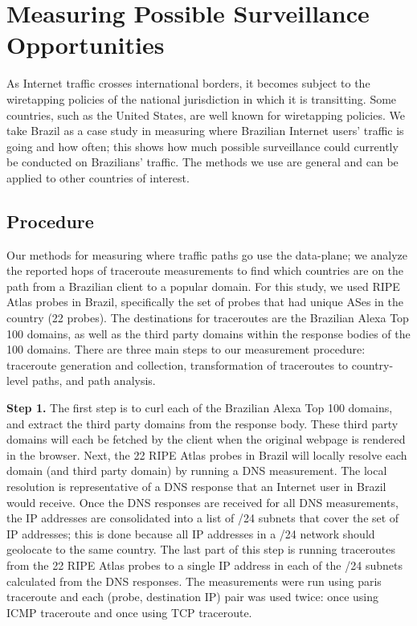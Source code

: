 \section{Measuring Possible Surveillance Opportunities}
\label{measure}
As Internet traffic crosses international borders, it becomes subject to the wiretapping policies of the national jurisdiction in which it is transitting.  Some countries, such as the United States, are well known for wiretapping policies.  We take Brazil as a case study in measuring where Brazilian Internet users' traffic is going and how often; this shows how much possible surveillance could currently be conducted on Brazilians' traffic.  The methods we use are general and can be applied to other countries of interest.

\subsection{Procedure}
Our methods for measuring where traffic paths go use the data-plane; we analyze the reported hops of traceroute measurements to find which countries are on the path from a Brazilian client to a popular domain.  For this study, we used RIPE Atlas probes in Brazil, specifically the set of probes that had unique ASes in the country (22 probes).  The destinations for traceroutes are the Brazilian Alexa Top 100 domains, as well as the third party domains within the response bodies of the 100 domains.  There are three main steps to our measurement procedure: traceroute generation and collection, transformation of traceroutes to country-level paths, and path analysis.

{\bf Step 1.} The first step is to curl each of the Brazilian Alexa Top 100 domains, and extract the third party domains from the response body.  These third party domains will each be fetched by the client when the original webpage is rendered in the browser.  Next, the 22 RIPE Atlas probes in Brazil will locally resolve each domain (and third party domain) by running a DNS measurement.  The local resolution is representative of a DNS response that an Internet user in Brazil would receive.  Once the DNS responses are received for all DNS measurements, the IP addresses are consolidated into a list of /24 subnets that cover the set of IP addresses; this is done because all IP addresses in a /24 network should geolocate to the same country.  The last part of this step is running traceroutes from the 22 RIPE Atlas probes to a single IP address in each of the /24 subnets calculated from the DNS responses.  The measurements were run using paris traceroute and each (probe, destination IP) pair was used twice: once using ICMP traceroute and once using TCP traceroute.  

